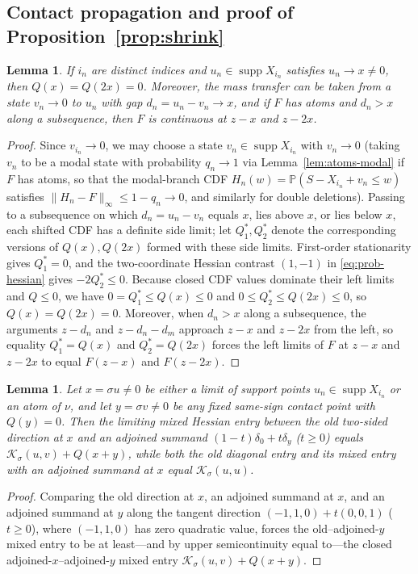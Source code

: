 \documentclass[11pt]{article}
\numberwithin{equation}{section}
\newtheorem{lemma}[theorem]{Lemma}
\theoremstyle{definition}
\DeclareMathOperator{\supp}{supp}
\newcommand{\Pp}{\mathbb P}
\begin{document}
\subsection{Contact propagation and proof of Proposition~\ref{prop:shrink}}

\begin{lemma}\label{lem:limit-double}
If $i_n$ are distinct indices and $u_n\in\supp X_{i_n}$ satisfies
$u_n\to x\ne0$, then $Q(x)=Q(2x)=0$. Moreover, the mass transfer can be taken
from a state $v_n\to0$ to $u_n$ with gap $d_n=u_n-v_n\to x$, and if $F$ has
atoms and $d_n>x$ along a subsequence, then $F$ is continuous at $z-x$ and
$z-2x$.
\end{lemma}
\begin{proof}
Since $v_{i_n}\to0$, we may choose a state $v_n\in\supp X_{i_n}$ with
$v_n\to0$ (taking $v_n$ to be a modal state with probability $q_n\to1$ via
Lemma~\ref{lem:atoms-modal} if $F$ has atoms, so that the modal-branch CDF
$H_n(w)=\Pp(S-X_{i_n}+v_n\le w)$ satisfies $\|H_n-F\|_\infty\le1-q_n\to0$,
and similarly for double deletions). Passing to a subsequence on which
$d_n=u_n-v_n$ equals $x$, lies above $x$, or lies below $x$, each shifted CDF
has a definite side limit; let $Q_1^*,Q_2^*$ denote the corresponding versions
of $Q(x),Q(2x)$ formed with these side limits. First-order stationarity gives
$Q_1^*=0$, and the two-coordinate Hessian contrast $(1,-1)$ in
\eqref{eq:prob-hessian} gives $-2Q_2^*\le0$. Because closed CDF values
dominate their left limits and $Q\le0$, we have $0=Q_1^*\le Q(x)\le0$ and
$0\le Q_2^*\le Q(2x)\le0$, so $Q(x)=Q(2x)=0$. Moreover, when $d_n>x$ along a
subsequence, the arguments $z-d_n$ and $z-d_n-d_m$ approach $z-x$ and $z-2x$
from the left, so equality $Q_1^*=Q(x)$ and $Q_2^*=Q(2x)$ forces the left
limits of $F$ at $z-x$ and $z-2x$ to equal $F(z-x)$ and $F(z-2x)$.
\end{proof}

\begin{lemma}\label{lem:closed-copy}
Let $x=\sigma u\ne0$ be either a limit of support points $u_n\in\supp X_{i_n}$
or an atom of $\nu$, and let $y=\sigma v\ne0$ be any fixed same-sign contact
point with $Q(y)=0$. Then the limiting mixed Hessian entry between the old
two-sided direction at $x$ and an adjoined summand $(1-t)\delta_0+t\delta_y$
($t\ge0$) equals $\mathcal K_\sigma(u,v)+Q(x+y)$, while both the old diagonal
entry and its mixed entry with an adjoined summand at $x$ equal
$\mathcal K_\sigma(u,u)$.
\end{lemma}
\begin{proof}
Comparing the old direction at $x$, an adjoined summand at $x$, and an
adjoined summand at $y$ along the tangent direction $(-1,1,0)+t(0,0,1)$ ($t\ge0$),
where $(-1,1,0)$ has zero quadratic value, forces the old--adjoined-$y$ mixed
entry to be at least---and by upper semicontinuity equal to---the closed
adjoined-$x$--adjoined-$y$ mixed entry $\mathcal K_\sigma(u,v)+Q(x+y)$.
\end{proof}
\end{document}
